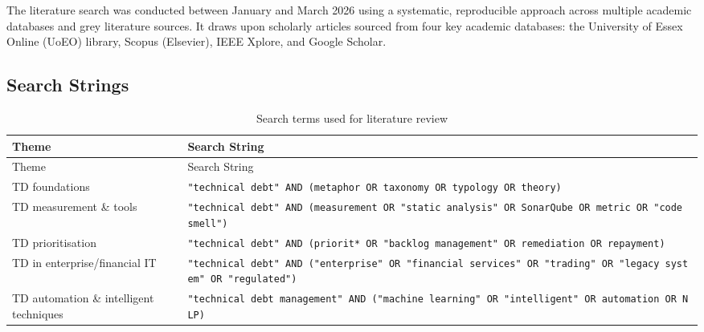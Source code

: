\documentclass[
  11pt,
  letterpaper,
  11pt,
  oneside,
  english,
  onehalfspacing,
  headsepline]{MastersDoctoralThesis}
\begin{document}
The literature search was conducted between January and March 2026 using
a systematic, reproducible approach across multiple academic databases
and grey literature sources. It draws upon scholarly articles sourced
from four key academic databases: the University of Essex Online (UoEO)
library, Scopus (Elsevier), IEEE Xplore, and Google Scholar.

\subsection{Search Strings}\label{search-strings}

\begin{longtable}[]{@{}
  >{\raggedright\arraybackslash}p{}
  >{\raggedright\arraybackslash}p{}@{}}
\caption{Search terms used for literature
review}\label{tbl-status}\tabularnewline
\toprule\noalign{}
\begin{minipage}[b]{\linewidth}\raggedright
Theme
\end{minipage} & \begin{minipage}[b]{\linewidth}\raggedright
Search String
\end{minipage} \\
\midrule\noalign{}
\endfirsthead
\toprule\noalign{}
\begin{minipage}[b]{\linewidth}\raggedright
Theme
\end{minipage} & \begin{minipage}[b]{\linewidth}\raggedright
Search String
\end{minipage} \\
\midrule\noalign{}
\endhead
\bottomrule\noalign{}
\endlastfoot
TD foundations &
\texttt{"technical\ debt"\ AND\ (metaphor\ OR\ taxonomy\ OR\ typology\ OR\ theory)} \\
TD measurement \& tools &
\texttt{"technical\ debt"\ AND\ (measurement\ OR\ "static\ analysis"\ OR\ SonarQube\ OR\ metric\ OR\ "code\ smell")} \\
TD prioritisation &
\texttt{"technical\ debt"\ AND\ (priorit*\ OR\ "backlog\ management"\ OR\ remediation\ OR\ repayment)} \\
TD in enterprise/financial IT &
\texttt{"technical\ debt"\ AND\ ("enterprise"\ OR\ "financial\ services"\ OR\ "trading"\ OR\ "legacy\ system"\ OR\ "regulated")} \\
TD automation \& intelligent techniques &
\texttt{"technical\ debt\ management"\ AND\ ("machine\ learning"\ OR\ "intelligent"\ OR\ automation\ OR\ NLP)} \\

\end{longtable}
\end{document}
